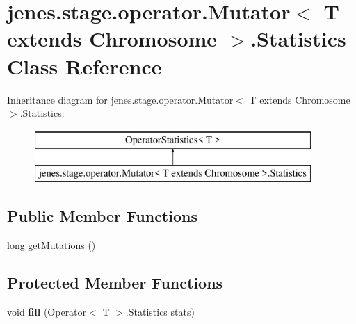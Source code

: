 \hypertarget{classjenes_1_1stage_1_1operator_1_1_mutator_3_01_t_01extends_01_chromosome_01_4_1_1_statistics}{\section{jenes.\-stage.\-operator.\-Mutator$<$ T extends Chromosome $>$.Statistics Class Reference}
\label{classjenes_1_1stage_1_1operator_1_1_mutator_3_01_t_01extends_01_chromosome_01_4_1_1_statistics}
}
Inheritance diagram for jenes.\-stage.\-operator.\-Mutator$<$ T extends Chromosome $>$.Statistics\-:\begin{figure}[H]
\begin{center}
\leavevmode
\includegraphics[height=2.000000cm]{classjenes_1_1stage_1_1operator_1_1_mutator_3_01_t_01extends_01_chromosome_01_4_1_1_statistics}
\end{center}
\end{figure}
\subsection*{Public Member Functions}
\begin{DoxyCompactItemize}
\item 
long \hyperlink{classjenes_1_1stage_1_1operator_1_1_mutator_3_01_t_01extends_01_chromosome_01_4_1_1_statistics_afc74de8d8cf1b0d1cdaf9ec3a170c80e}{get\-Mutations} ()
\end{DoxyCompactItemize}
\subsection*{Protected Member Functions}
\begin{DoxyCompactItemize}
\item 
\hypertarget{classjenes_1_1stage_1_1operator_1_1_mutator_3_01_t_01extends_01_chromosome_01_4_1_1_statistics_af114cf6ccf66e1bd5d5d7337b4e15e28}{void {\bfseries fill} (Operator$<$ T $>$.Statistics stats)}\label{classjenes_1_1stage_1_1operator_1_1_mutator_3_01_t_01extends_01_chromosome_01_4_1_1_statistics_af114cf6ccf66e1bd5d5d7337b4e15e28}

\end{DoxyCompactItemize}
